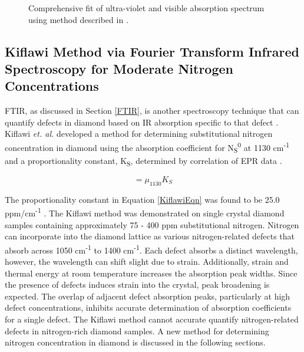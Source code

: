 \begin{figure}
    \centering
    
    \caption{Comprehensive fit of ultra-violet and visible absorption spectrum using method described in \cite{Luo2021}.}
    \label{fig:UVVisFit}
\end{figure}

\subsection{Kiflawi Method via Fourier Transform Infrared Spectroscopy for Moderate Nitrogen Concentrations}
\indent

FTIR, as discussed in Section \ref{FTIR}, is another spectroscopy technique that can quantify defects in diamond based on IR absorption specific to that defect \cite{Davies1977TheDiamond, Chrenko1971DispersedDiamonds}. Kiflawi \textit{et. al.} developed a method for determining substitutional nitrogen concentration in diamond using the absorption coefficient for N\textsubscript{S}\textsuperscript{0} at 1130 cm\textsuperscript{-1} and a proportionality constant, K\textsubscript{S}, determined by correlation of EPR data \cite{Kiflawi1994InfraredDiamond}.

\begin{equation}
        [N_s^0]=\mu_{1130}K_{S}
    \label{KiflawiEqn}
\end{equation}

The proportionality constant in Equation \ref{KiflawiEqn} was found to be 25.0 ppm/cm\textsuperscript{-1} \cite{Kiflawi1994InfraredDiamond}. The Kiflawi method was demonstrated on single crystal diamond samples containing approximately 75 - 400 ppm substitutional nitrogen. Nitrogen can incorporate into the diamond lattice as various nitrogen-related defects that absorb across 1050 cm\textsuperscript{-1} to 1400 cm\textsuperscript{-1}. Each defect absorbs a distinct wavelength, however, the wavelength can shift slight due to strain. Additionally, strain and thermal energy at room temperature increases the absorption peak widths. Since the presence of defects induces strain into the crystal, peak broadening is expected. The overlap of adjacent defect absorption peaks, particularly at high defect concentrations, inhibits accurate determination of absorption coefficients for a single defect. The Kiflawi method cannot accurate quantify nitrogen-related defects in nitrogen-rich diamond samples. A new method for determining nitrogen concentration in diamond is discussed in the following sections.

